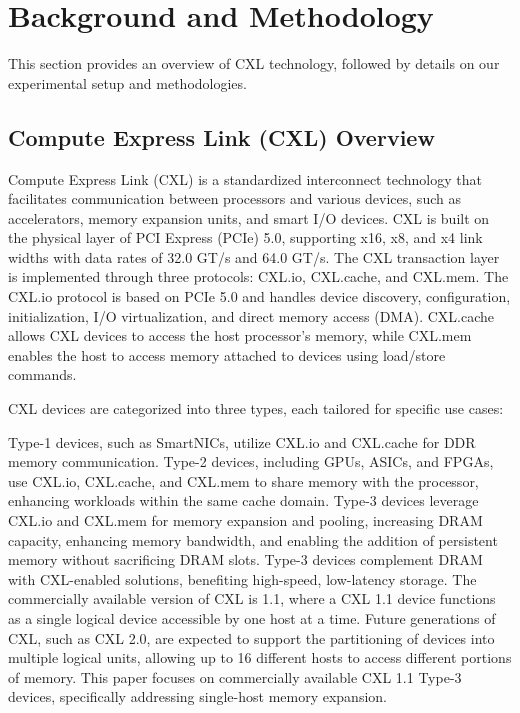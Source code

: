 \section{Background and Methodology} \label{sec
}

This section provides an overview of CXL technology, followed by details on our experimental setup and methodologies.

\subsection{Compute Express Link (CXL) Overview}

Compute Express Link (CXL) is a standardized interconnect technology that facilitates communication between processors and various devices, such as accelerators, memory expansion units, and smart I/O devices. CXL is built on the physical layer of PCI Express (PCIe) 5.0, supporting x16, x8, and x4 link widths with data rates of 32.0 GT/s and 64.0 GT/s. The CXL transaction layer is implemented through three protocols: CXL.io, CXL.cache, and CXL.mem. The CXL.io protocol is based on PCIe 5.0 and handles device discovery, configuration, initialization, I/O virtualization, and direct memory access (DMA). CXL.cache allows CXL devices to access the host processor's memory, while CXL.mem enables the host to access memory attached to devices using load/store commands.

CXL devices are categorized into three types, each tailored for specific use cases:

Type-1 devices, such as SmartNICs, utilize CXL.io and CXL.cache for DDR memory communication.
Type-2 devices, including GPUs, ASICs, and FPGAs, use CXL.io, CXL.cache, and CXL.mem to share memory with the processor, enhancing workloads within the same cache domain.
Type-3 devices leverage CXL.io and CXL.mem for memory expansion and pooling, increasing DRAM capacity, enhancing memory bandwidth, and enabling the addition of persistent memory without sacrificing DRAM slots. Type-3 devices complement DRAM with CXL-enabled solutions, benefiting high-speed, low-latency storage.
The commercially available version of CXL is 1.1, where a CXL 1.1 device functions as a single logical device accessible by one host at a time. Future generations of CXL, such as CXL 2.0, are expected to support the partitioning of devices into multiple logical units, allowing up to 16 different hosts to access different portions of memory. This paper focuses on commercially available CXL 1.1 Type-3 devices, specifically addressing single-host memory expansion.

